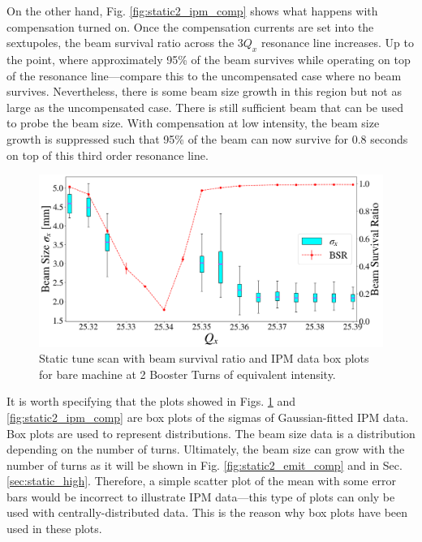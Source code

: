 On the other hand, Fig. \ref{fig:static2_ipm_comp} shows what happens with compensation turned on. Once the compensation currents are set into the sextupoles, the beam survival ratio across the $3Q_x$ resonance line increases. Up to the point, where approximately 95\% of the beam survives while operating on top of the resonance line---compare this to the uncompensated case where no beam survives. Nevertheless, there is some beam size growth in this region but not as large as the uncompensated case. There is still sufficient beam that can be used to probe the beam size. With compensation at low intensity, the beam size growth is suppressed such that 95\% of the beam can now survive for 0.8 seconds on top of this third order resonance line.   

\begin{figure}[H]
    \centering
    \includegraphics[width=\columnwidth]{chapter4/static2turns_ipm.png}
    \caption{Static tune scan with beam survival ratio and IPM data box plots for bare machine at 2 Booster Turns of equivalent intensity.}
    \label{fig:static2_ipm}
\end{figure}

It is worth specifying that the plots showed in Figs. \ref{fig:static2_ipm} and \ref{fig:static2_ipm_comp} are box plots of the sigmas of Gaussian-fitted IPM data. Box plots are used to represent distributions. The beam size data is a distribution depending on the number of turns. Ultimately, the beam size can grow with the number of turns as it will be shown in Fig. \ref{fig:static2_emit_comp} and in Sec. \ref{sec:static_high}. Therefore, a simple scatter plot of the mean with some error bars would be incorrect to illustrate IPM data---this type of plots can only be used with centrally-distributed data. This is the reason why box plots have been used in these plots.


